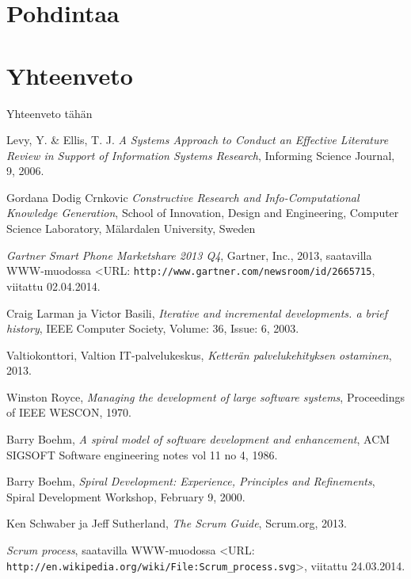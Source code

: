 \documentclass[finnish,nonumbib,nocopyright]{gradu2}
\begin{document}
\chapter{Pohdintaa}

\chapter{Yhteenveto}

Yhteenveto tähän

\begin{thebibliography}{9} %

Levy, Y. \& Ellis, T. J. \textit{A Systems Approach to Conduct an Effective Literature Review in Support of Information Systems Research},
Informing Science Journal, 9, 2006.

Gordana Dodig Crnkovic \textit{Constructive Research and Info-Computational Knowledge Generation},
School of Innovation, Design and Engineering, Computer Science Laboratory, Mälardalen University, Sweden

\textit{Gartner Smart Phone Marketshare 2013 Q4}, Gartner, Inc., 2013, saatavilla WWW-muodossa
<URL: \texttt{http://www.gartner.com/newsroom/id/2665715}, viitattu 02.04.2014.

Craig Larman ja Victor Basili, \textit{Iterative and incremental developments. a brief history},
IEEE Computer Society, Volume: 36, Issue: 6, 2003.

Valtiokonttori, Valtion IT-palvelukeskus, \textit{Ketterän palvelukehityksen ostaminen}, 2013. 

Winston Royce, \textit{Managing the development of large software systems},
Proceedings of IEEE WESCON, 1970.

Barry Boehm, \textit{A spiral model of software development and enhancement},
ACM SIGSOFT Software engineering notes vol 11 no 4, 1986.

Barry Boehm, \textit{Spiral Development: Experience, Principles and Refinements},
Spiral Development Workshop, February 9, 2000.

Ken Schwaber ja Jeff Sutherland, \textit{The Scrum Guide}, Scrum.org, 2013.

\textit{Scrum process}, saatavilla WWW-muodossa
<URL: \texttt{http://en.wikipedia.org/wiki/File:Scrum\_process.svg}>, viitattu 24.03.2014.


\end{thebibliography}
\end{document}
